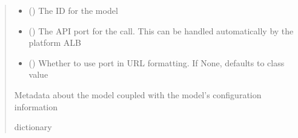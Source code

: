 \documentclass[letterpaper,10pt,english]{sphinxmanual}
\begin{document}
\begin{fulllineitems}
\begin{fulllineitems}
\begin{sphinxVerbatim}[commandchars=\\\{\}]
 
  
\end{sphinxVerbatim}
\begin{quote}\begin{description}
\begin{itemize}
\item {} 
\sphinxAtStartPar
{} () \textendash{} The ID for the model

\item {} 
\sphinxAtStartPar
{} (\sphinxstyleliteralemphasis{\sphinxupquote{ (}}\sphinxstyleliteralemphasis{\sphinxupquote{)}}) \textendash{} The API port for the call. This can be handled automatically by the platform ALB

\item {} 
\sphinxAtStartPar
{} (\sphinxstyleliteralemphasis{\sphinxupquote{ (}}\sphinxstyleliteralemphasis{\sphinxupquote{)}}) \textendash{} Whether to use port in URL formatting. If None, defaults to class value

\end{itemize}

\sphinxAtStartPar
{} \textendash{} Metadata about the model coupled with the model’s configuration information

\sphinxAtStartPar
dictionary

\end{description}\end{quote}


\end{fulllineitems}
\end{fulllineitems}
\end{document}

